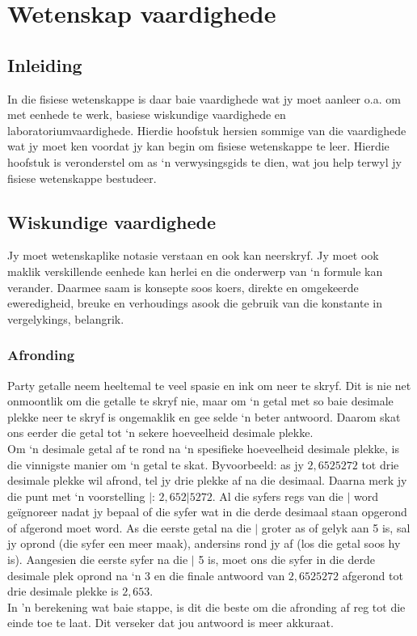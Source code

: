          \chapter{Wetenskap vaardighede}
    \setcounter{figure}{1}\setcounter{subfigure}{1}\label{m30853}
    \section{Inleiding}
            \nopagebreak
In die fisiese wetenskappe is daar baie vaardighede wat jy moet aanleer o.a. om met eenhede te werk, basiese wiskundige vaardighede en laboratoriumvaardighede. Hierdie hoofstuk hersien sommige van die vaardighede wat jy moet ken voordat jy kan begin om fisiese wetenskappe te leer. Hierdie hoofstuk is veronderstel om as ‘n verwysingsgids te dien, wat jou help terwyl jy fisiese wetenskappe bestudeer. 
\section{Wiskundige vaardighede}
Jy moet wetenskaplike notasie verstaan en ook kan neerskryf. Jy moet ook maklik verskillende eenhede kan herlei en die onderwerp van ‘n formule kan verander. Daarmee saam is konsepte soos koers, direkte en omgekeerde eweredigheid, breuke en verhoudings asook die gebruik van die konstante in vergelykings, belangrik.  
\subsection*{Afronding}
Party getalle neem heeltemal te veel spasie en ink om neer te skryf. Dit is nie net onmoontlik om die getalle te skryf nie, maar om ‘n getal met so baie desimale plekke neer te skryf is ongemaklik en gee selde ‘n beter antwoord. Daarom skat ons eerder die getal tot ‘n sekere hoeveelheid desimale plekke. \\
Om ‘n desimale getal af te rond na ‘n spesifieke hoeveelheid desimale plekke, is die vinnigste manier om ‘n getal te skat. Byvoorbeeld: as jy $2,6525272$ tot drie desimale plekke wil afrond, tel jy drie plekke af na die desimaal. Daarna merk jy die punt met ‘n voorstelling $|$: $2,652|5272$. Al die syfers regs van die $|$ word geïgnoreer nadat jy bepaal of die syfer wat in die derde desimaal staan opgerond of afgerond moet word. As die eerste getal na die $|$ groter as of gelyk aan 5 is, sal jy oprond (die syfer een meer maak), andersins rond jy af (los die getal soos hy is). Aangesien die eerste syfer na die $|$ 5 is, moet ons die syfer in die derde desimale plek oprond na ‘n 3 en die finale antwoord van $2,6525272$ afgerond tot drie desimale plekke is $2,653$. \\
In 'n berekening wat baie stappe, is dit die beste om die afronding af reg tot die einde toe te laat. Dit verseker dat jou antwoord is meer akkuraat.
